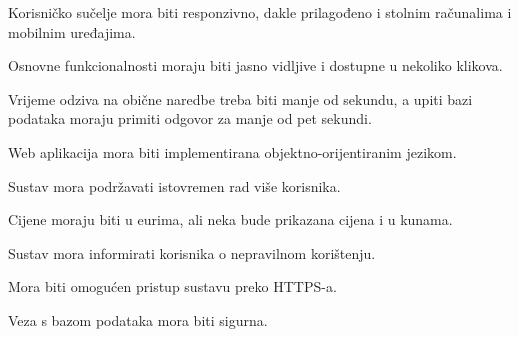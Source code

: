 			
			 \begin{packed_item}
			 
			 \item Korisničko sučelje mora biti responzivno, dakle prilagođeno i stolnim računalima i mobilnim uređajima.
			 
			 \item Osnovne funkcionalnosti moraju biti jasno vidljive i dostupne u nekoliko klikova.
			 
			 \item Vrijeme odziva na obične naredbe treba biti manje od sekundu, a upiti bazi podataka moraju primiti odgovor za manje od pet sekundi.
			 
			 \item Web aplikacija mora biti implementirana objektno-orijentiranim jezikom.
			 
			 \item Sustav mora podržavati istovremen rad više korisnika.
			 
			 \item Cijene moraju biti u eurima, ali neka bude prikazana cijena i u kunama.
			 
			 \item Sustav mora informirati korisnika o nepravilnom korištenju.
			 
			 \item Mora biti omogućen pristup sustavu preko HTTPS-a.
			 
			 \item Veza s bazom podataka mora biti sigurna.
			 
			 	
			 \end{packed_item}
			 
			 
			
			 
			 